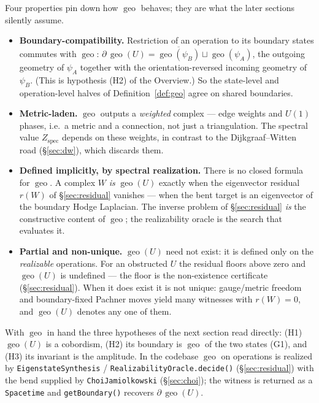 \documentclass[11pt]{article}
\theoremstyle{plain}
\theoremstyle{definition}
\theoremstyle{remark}
\newcommand{\geo}{\operatorname{geo}}
\begin{document}
\noindent
Four properties pin down how $\geo$ behaves; they are what the later sections
silently assume.

\begin{itemize}
\item[\textbf{(G1)}] \textbf{Boundary-compatibility.} Restriction of an operation
  to its boundary states commutes with $\geo$:
  $\partial\,\geo(U) = \overline{\geo(\psi_B)} \sqcup \geo(\psi_A)$, the outgoing
  geometry of $\psi_A$ together with the orientation-reversed incoming geometry
  of $\psi_B$. (This is hypothesis (H2) of the Overview.) So the state-level and
  operation-level halves of Definition~\ref{def:geo} agree on shared boundaries.
\item[\textbf{(G2)}] \textbf{Metric-laden.} $\geo$ outputs a \emph{weighted}
  complex --- edge weights and $U(1)$ phases, i.e.\ a metric and a connection,
  not just a triangulation. The spectral value $Z_{\mathrm{spec}}$ depends on
  these weights, in contrast to the Dijkgraaf--Witten road
  (\S\ref{sec:dw}), which discards them.
\item[\textbf{(G3)}] \textbf{Defined implicitly, by spectral realization.} There
  is no closed formula for $\geo$. A complex $W$ \emph{is} $\geo(U)$ exactly when
  the eigenvector residual $r(W)$ of \S\ref{sec:residual} vanishes --- when the
  bent target is an eigenvector of the boundary Hodge Laplacian. The inverse
  problem of \S\ref{sec:residual} \emph{is} the constructive content of $\geo$;
  the realizability oracle is the search that evaluates it.
\item[\textbf{(G4)}] \textbf{Partial and non-unique.} $\geo(U)$ need not exist:
  it is defined only on the \emph{realizable} operations. For an obstructed $U$
  the residual floors above zero and $\geo(U)$ is undefined --- the floor is the
  non-existence certificate (\S\ref{sec:residual}). When it does exist it is not
  unique: gauge/metric freedom and boundary-fixed Pachner moves yield many
  witnesses with $r(W)=0$, and $\geo(U)$ denotes any one of them.
\end{itemize}

\noindent
With $\geo$ in hand the three hypotheses of the next section read directly:
(H1) $\geo(U)$ is a cobordism, (H2) its boundary is $\geo$ of the two states
(G1), and (H3) its invariant is the amplitude. In the codebase $\geo$ on
operations is realized by \texttt{EigenstateSynthesis} /
\texttt{RealizabilityOracle.decide()} (\S\ref{sec:residual}) with the bend
supplied by \texttt{ChoiJamiolkowski} (\S\ref{sec:choi}); the witness is returned
as a \texttt{Spacetime} and \texttt{getBoundary()} recovers $\partial\,\geo(U)$.
\end{document}
